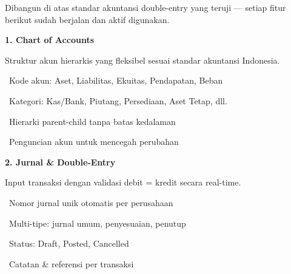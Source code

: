 \documentclass[a4paper]{article}
\begin{document}
{\fontsize{9.5}{13}\selectfont\color{TextLight}
Dibangun di atas standar akuntansi double-entry yang teruji — setiap fitur berikut sudah berjalan dan aktif digunakan.}

\vspace{6pt}

\noindent
\begin{minipage}[t]{0.485\textwidth}
    \colorbox{TealPrimary}{%
        \begin{minipage}{\dimexpr\textwidth-14pt}
            \vspace{5pt}
            {\fontsize{10}{13}\selectfont\bfseries\color{White} 1. Chart of Accounts}
            \vspace{5pt}
        \end{minipage}}
    \vspace{5pt}
    {\fontsize{9}{12}\selectfont\color{TextDark}%
    Struktur akun hierarkis yang fleksibel sesuai standar akuntansi Indonesia.\par\vspace{3pt}
    \textbullet\ Kode akun: Aset, Liabilitas, Ekuitas, Pendapatan, Beban\par\vspace{2pt}%
    \textbullet\ Kategori: Kas/Bank, Piutang, Persediaan, Aset Tetap, dll.\par\vspace{2pt}%
    \textbullet\ Hierarki parent-child tanpa batas kedalaman\par\vspace{2pt}%
    \textbullet\ Penguncian akun untuk mencegah perubahan}%
\end{minipage}%
\hfill
\begin{minipage}[t]{0.485\textwidth}
    \colorbox{BluePrimary}{%
        \begin{minipage}{\dimexpr\textwidth-14pt}
            \vspace{5pt}
            {\fontsize{10}{13}\selectfont\bfseries\color{White} 2. Jurnal \& Double-Entry}
            \vspace{5pt}
        \end{minipage}}
    \vspace{5pt}
    {\fontsize{9}{12}\selectfont\color{TextDark}%
    Input transaksi dengan validasi debit = kredit secara real-time.\par\vspace{3pt}
    \textbullet\ Nomor jurnal unik otomatis per perusahaan\par\vspace{2pt}%
    \textbullet\ Multi-tipe: jurnal umum, penyesuaian, penutup\par\vspace{2pt}%
    \textbullet\ Status: Draft, Posted, Cancelled\par\vspace{2pt}%
    \textbullet\ Catatan \& referensi per transaksi}%
\end{minipage}
\end{document}
